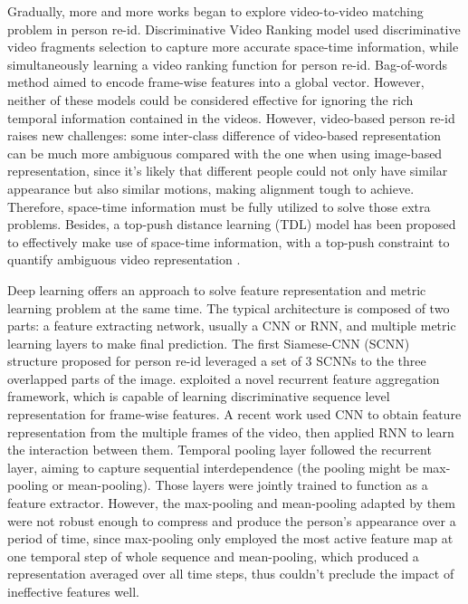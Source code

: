 \documentclass[10pt,twocolumn,letterpaper]{article}
\begin{document}
Gradually, more and more works began to explore video-to-video matching problem in  person re-id. Discriminative Video Ranking model \cite{video_ranking} used discriminative video fragments selection to capture more accurate space-time information, while simultaneously learning a video ranking function for person re-id. Bag-of-words \cite{Zheng} method aimed to encode frame-wise features into a global vector. However, neither of these models could be considered effective for ignoring the rich temporal information contained in the videos. However, video-based person re-id raises new challenges: some inter-class difference of video-based representation can be much more ambiguous compared with the one when using image-based representation, since it's likely that different people could not only have similar appearance but also similar motions, making alignment tough to achieve. Therefore, space-time information must be fully utilized to solve those extra problems. Besides, a top-push distance learning (TDL) model has been proposed to effectively make use of space-time information, with a top-push constraint to quantify ambiguous video representation \cite{TDL}.

Deep learning offers an approach to solve feature representation and metric learning problem at the same time. The typical architecture is composed of two parts: a feature extracting network, usually a CNN or RNN, and multiple metric learning layers to make final prediction. The first Siamese-CNN (SCNN) structure \cite{SCNN} proposed for person re-id leveraged a set of 3 SCNNs to the three overlapped parts of the image.
\cite{RFA} exploited a novel recurrent feature aggregation framework, which is capable of learning discriminative sequence level representation for frame-wise features.
A recent work \cite{C_RNN} used CNN to obtain feature representation from the multiple frames of the video, then applied RNN to learn the interaction between them. Temporal pooling layer followed the recurrent layer, aiming to capture sequential interdependence (the pooling might be max-pooling or mean-pooling). Those layers were jointly trained to function as a feature extractor. However, the max-pooling and mean-pooling adapted by them were not robust enough to compress and produce the person's appearance over a period of time, since max-pooling only employed the most active feature map at one temporal step of whole sequence and mean-pooling, which produced a representation averaged over all time steps, thus couldn't preclude the impact of ineffective features well. 
\end{document}
